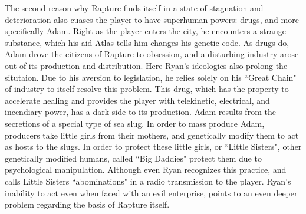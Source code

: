 \documentclass{article}
\begin{document}
The second reason why Rapture finds itself in a state of stagnation and deterioration also cuases the player
to have superhuman powers: drugs, and more specifically Adam. Right as the player enters the city, he 
encounters a strange substance, which his aid Atlas tells him changes his genetic code. As drugs do, Adam 
drove the citizens of Rapture to obsession, and a disturbing industry arose out of its production and 
distribution. Here Ryan's ideologies also prolong the situtaion. Due to his aversion to legislation, he relies
solely on his ``Great Chain" of industry to itself resolve this problem. This drug, which has the property to 
accelerate healing and provides the player with telekinetic, electrical, and incendiary power, has a dark side 
to its  production. Adam results from the secretions of a special type of sea slug. In order to mass produce
Adam, producers take little girls from their mothers, and genetically modify them to act as hosts to the slugs. 
In order to protect these little girls, or ``Little Sisters", other genetically modified humans, called
``Big Daddies" protect them due to psychological manipulation. Although even Ryan recognizes this practice,
and calls Little Sisters ``abominations" in a radio transmission to the player. Ryan's inability to act even 
when faced with an evil enterprise, points to an even deeper problem regarding the basis of Rapture itself. 
\end{document}
